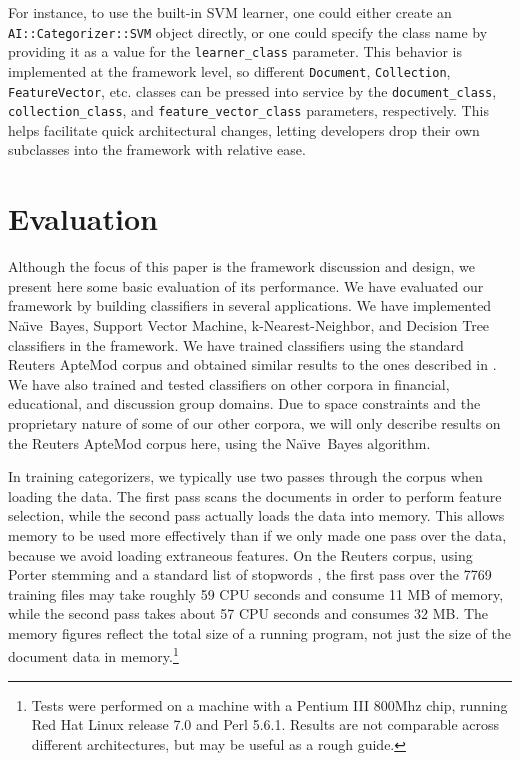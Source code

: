 \documentclass[twocolumn]{article}
\newcommand{\naive}{Na\"\i ve}
\newcommand{\class}[1]{\texttt{#1}}
\newcommand{\param}[1]{\texttt{#1}}
\newcommand{\aicat}{\texttt{AI::Cat\-e\-gor\-i\-zer}}
\begin{document}
For instance, to use the built-in SVM learner, one could either create
an \aicat\texttt{::SVM} object directly, or one could specify
the class name by providing it as a value for the
\param{learner\_class} parameter.  This behavior is implemented at
the framework level, so different \class{Document},
\class{Collection}, \class{FeatureVector}, etc. classes can be
pressed into service by the \param{document\_class},
\param{collection\_class}, and \param{feature\_vector\_class}
parameters, respectively.  This helps facilitate quick architectural
changes, letting developers drop their own subclasses into the
framework with relative ease.


\section{Evaluation}

Although the focus of this paper is the framework discussion and
design, we present here some basic evaluation of its performance.
We have evaluated our framework by building classifiers in several
applications.  We have implemented \naive\ Bayes, Support Vector
Machine, k-Nearest-Neighbor, and Decision Tree classifiers in the
framework.  We have trained classifiers using the standard Reuters
ApteMod corpus and obtained similar results to the ones described in
\cite{yang:99}.  We have also trained and tested classifiers on other
corpora in financial, educational, and discussion group domains.  Due
to space constraints and the proprietary nature of some of our other
corpora, we will only describe results on the Reuters ApteMod corpus
here, using the \naive\ Bayes algorithm.

In training categorizers, we typically use two passes through the
corpus when loading the data.  The first pass scans the documents in
order to perform feature selection, while the second pass actually
loads the data into memory.  This allows memory to be used more
effectively than if we only made one pass over the data, because we
avoid loading extraneous features.  On the Reuters corpus, using
Porter stemming \cite{porter:80} and a standard list of stopwords
\cite{salton:89}, the first
pass over the 7769 training files may take roughly 59 CPU seconds and
consume 11 MB of memory, while the second pass takes about 57 CPU
seconds and consumes 32 MB\@.  The memory figures reflect the total
size of a running program, not just the size of the document data in
memory.\footnote{Tests were performed on a machine with a Pentium III
800Mhz chip, running Red Hat Linux release 7.0 and Perl 5.6.1.
Results are not comparable across different architectures, but may be
useful as a rough guide.}
\end{document}
